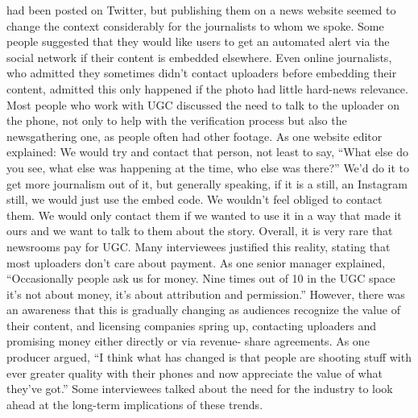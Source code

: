 \begin{enumerate}
had been posted on Twitter, but publishing them on a news website seemed
to change the context considerably for the journalists to whom we spoke.
Some people suggested that they would like users to get an automated alert
via the social network if their content is embedded elsewhere.
Even online journalists, who admitted they sometimes didn't contact
uploaders before embedding their content, admitted this only happened
if the photo had little hard-news relevance. Most people who work with
UGC discussed the need to talk to the uploader on the phone, not only to
help with the verification process but also the newsgathering one, as people
often had other footage. As one website editor explained:
We would try and contact that person, not least to say, ``What else do
you see, what else was happening at the time, who else was there?''
We'd do it to get more journalism out of it, but generally speaking, if
it is a still, an Instagram still, we would just use the embed code. We
wouldn't feel obliged to contact them. We would only contact them
if we wanted to use it in a way that made it ours and we want to talk
to them about the story.
Overall, it is very rare that newsrooms pay for UGC. Many interviewees justified
this reality, stating that most uploaders don't care about payment. As
one senior manager explained, ``Occasionally people ask us for money. Nine
times out of 10 in the UGC space it's not about money, it's about attribution
and permission.''
However, there was an awareness that this is gradually changing as audiences
recognize the value of their content, and licensing companies spring
up, contacting uploaders and promising money either directly or via revenue-
share agreements. As one producer argued, ``I think what has changed
is that people are shooting stuff with ever greater quality with their phones
and now appreciate the value of what they've got.'' Some interviewees talked
about the need for the industry to look ahead at the long-term implications
of these trends.


\end{enumerate}
